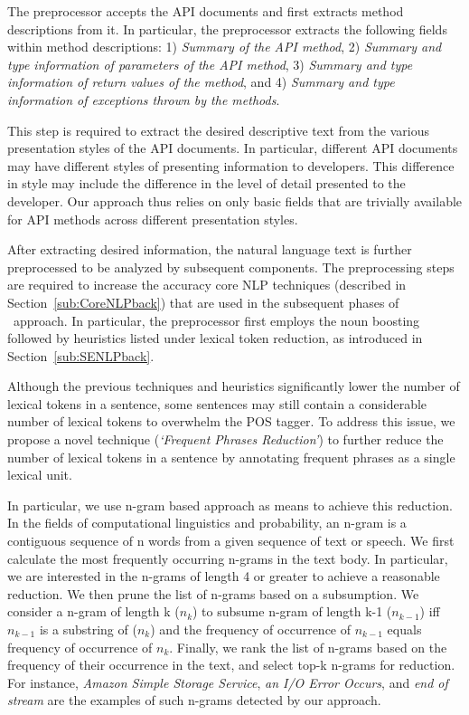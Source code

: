 The preprocessor accepts the API documents and first extracts method descriptions from it.
In particular, the preprocessor extracts the following fields within method descriptions: 
1) \textit{Summary of the API method},
2) \textit{Summary and type information of parameters of the API method}, 
3) \textit{Summary and type information of return values of the method}, and
4) \textit{Summary and type information of exceptions thrown by the methods}.

This step is required to extract the desired descriptive text from the various presentation styles of the API documents.
In particular, different API documents may have different styles of presenting information to developers.
This difference in style may include the difference in the level of detail presented to the developer.
Our approach thus relies on only basic fields that are trivially available for API methods across different presentation styles. 

After extracting desired information, the natural language text is further preprocessed to be analyzed by subsequent components.
The preprocessing steps are required to increase the accuracy core NLP techniques (described in Section~\ref{sub:CoreNLPback}) that are used in the subsequent phases of \tool\ approach.
In particular, the preprocessor first employs the noun boosting followed by heuristics listed under lexical token reduction, as introduced in Section~\ref{sub:SENLPback}.

Although the previous techniques and heuristics significantly lower the number of lexical tokens in a sentence, some sentences may still contain a considerable number of lexical tokens to overwhelm the POS tagger.
To address this issue, we propose a novel technique (\textit{`Frequent Phrases Reduction'}) to further reduce the number of lexical tokens in a sentence by annotating frequent phrases as a single lexical unit.

In particular, we use n-gram based approach as means to achieve this reduction. 
In the fields of computational linguistics and probability, an n-gram is a contiguous sequence of n words from a given sequence of text or speech. 
We first calculate the most frequently occurring n-grams in the text body. 
In particular, we are interested in the n-grams of length 4 or greater to achieve a reasonable reduction. 
We then prune the list of n-grams based on a subsumption. 
We consider a n-gram of length k ($n_k$) to subsume n-gram of length k-1 ($n_{k-1}$) iff $n_{k-1}$ is a substring of ($n_k$) and the frequency of occurrence of $n_{k-1}$ equals frequency of occurrence of $n_{k}$.
Finally, we rank the list of n-grams based on the frequency of their occurrence in the text, and select top-k n-grams for reduction.
For instance, \textit{Amazon Simple Storage Service}, \textit{an I/O Error Occurs}, and \textit{end of stream} are the examples of such n-grams detected by our approach.
 

